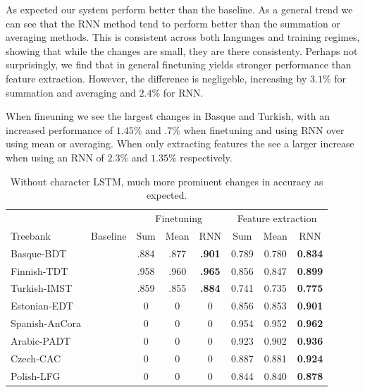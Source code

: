 \documentclass[11pt]{article}
\begin{document}
        As expected our system perform better than the baseline. As a
     general trend we can see that the RNN method tend to perform
     better than the summation or averaging methods. This is
     consistent across both languages and training regimes, showing
     that while the changes are small, they are there consistenty.
        Perhaps not surprisingly, we find that in general finetuning
     yields stronger performance than feature extraction. However, the
     difference is negligeble, increasing by $3.1\%$ for summation and
     averaging and $2.4\%$ for RNN.

            When fineuning we see the largest changes in Basque and
     Turkish, with an increased performance of $1.45\%$ and $.7\%$
     when finetuning and using RNN over using mean or averaging. When
     only extracting features the see a larger increase when using an
     RNN of $2.3\%$ and $1.35\%$ respectively.

    

	\begin{table}[h]
	\centering
	\begin{tabular}{l|c|ccc|ccc}
		& & \multicolumn{3}{c}{Finetuning} & \multicolumn{3}{c}{Feature extraction} \\
		Treebank & Baseline & Sum & Mean & RNN & Sum & Mean & RNN \\
		\hline
		Basque-BDT      & & .884 & .877 & \textbf{.901} & 0.789 & 0.780 & \textbf{0.834} \\
		Finnish-TDT     & & .958 & .960 & \textbf{.965} & 0.856 & 0.847 & \textbf{0.899} \\
		Turkish-IMST    & & .859 & .855 & \textbf{.884} & 0.741 & 0.735 & \textbf{0.775} \\
		Estonian-EDT    & & 0 & 0 & 0 & 0.856 & 0.853 & \textbf{0.901} \\
		Spanish-AnCora  & & 0 & 0 & 0 & 0.954 & 0.952 & \textbf{0.962} \\
		Arabic-PADT     & & 0 & 0 & 0 & 0.923 & 0.902 & \textbf{0.936} \\
		Czech-CAC       & & 0 & 0 & 0 & 0.887 & 0.881 & \textbf{0.924} \\
		Polish-LFG      & & 0 & 0 & 0 & 0.844 & 0.840 & \textbf{0.878} \\
		
	\end{tabular}
	\caption{\label{tab:results_tokens_nochars} Without character LSTM, much more prominent changes in accuracy as expected.}
    \end{table}
\end{document}

